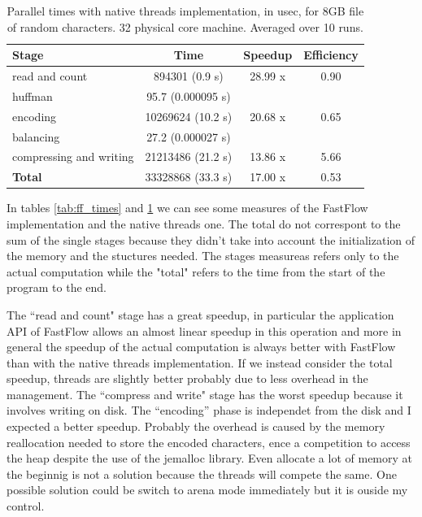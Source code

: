 \documentclass[12pt, letterpaper]{article}
\begin{document}
\begin{table}[h]
\begin{center}
\begin{tabular}{l c c c}
    \textbf{Stage} & \textbf{Time} & \textbf{Speedup} & \textbf{Efficiency}  \\
    \hline
    read and count & 894301 (0.9 s) & 28.99 x & 0.90  \\
    \hline
    huffman & 95.7 (0.000095 s) & \\
    \hline
    encoding & 10269624  (10.2 s) & 20.68 x & 0.65 \\
    \hline
    balancing & 27.2 (0.000027 s) & \\
    \hline
    compressing and writing & 21213486  (21.2 s) & 13.86 x & 5.66\\
    \hline
    \textbf{Total} & 33328868 (33.3 s) & 17.00 x & 0.53 \\ 
\end{tabular}
\caption{Parallel times with native threads implementation, in usec, for 8GB file of random characters. 32 physical core machine. Averaged over 10 runs.}    
\label{tab:thr_times}
\end{center}
\end{table}

In tables \ref{tab:ff_times} and \ref{tab:thr_times} we can see some measures of the FastFlow implementation and the native threads one. The total do not correspont to the sum of the single stages because they didn't take into account the initialization of the memory and the stuctures needed. The stages measureas refers only to the actual computation while the "total" refers to the time from the start of the program to the end.

The ``read and count" stage has a great speedup, in particular the application API of FastFlow allows an almost linear speedup in this operation and more in general the speedup of the actual computation is always better with FastFlow than with the native threads implementation. If we instead consider the total speedup, threads are slightly better probably due to less overhead in the management. The ``compress and write" stage has the worst speedup because it involves writing on disk. The ``encoding'' phase is independet from the disk and I expected a better speedup. Probably the overhead is caused by the memory reallocation needed to store the encoded characters, ence a competition to access the heap despite the use of the jemalloc library. Even allocate a lot of memory at the beginnig is not a solution because the threads will compete the same. One possible solution could be switch to arena mode immediately but it is ouside my control.
\end{document}
